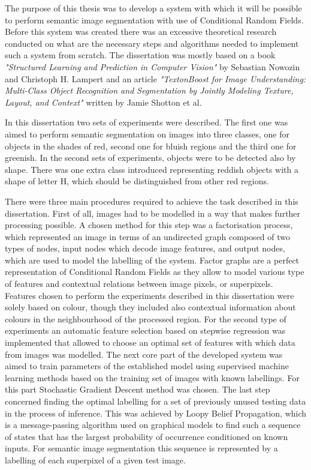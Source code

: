 The purpose of this thesis was to develop a system with which it will be possible to perform semantic image segmentation with use of Conditional Random Fields. Before this system was created there was an excessive theoretical research conducted on what are the necessary steps and algorithms needed to implement such a system from scratch. The dissertation was mostly based on a book \textit{"Structured Learning and Prediction in Computer Vision"} by Sebastian Nowozin and Christoph H. Lampert and an article \textit{"TextonBoost for Image Understanding: Multi-Class Object Recognition and Segmentation by Jointly Modeling Texture, Layout, and Context"} written by Jamie Shotton et al. 

In this dissertation two sets of experiments were described. The first one was aimed to perform semantic segmentation on images into three classes, one for objects in the shades of red, second one for bluish regions and the third one for greenish. In the second sets of experiments, objects were to be detected also by shape. There was one extra class introduced representing reddish objects with a shape of letter H, which should be distinguished from other red regions. 

There were three main procedures required to achieve the task described in this dissertation. First of all, images had to be modelled in a way that makes further processing possible. A chosen method for this step was a factorisation process, which represented an image in terms of an undirected graph composed of two types of nodes, input nodes which decode image features, and output nodes, which are used to model the labelling of the system. Factor graphs are a perfect representation of Conditional Random Fields as they allow to model various type of features and contextual relations between image pixels, or superpixels. Features chosen to perform the experiments described in this dissertation were solely based on colour, though they included also contextual information about colours in the neighbourhood of the processed region. For the second type of experiments an automatic feature selection based on stepwise regression was implemented that allowed to choose an optimal set of features with which data from images was modelled. The next core part of the developed system was aimed to train parameters of the established model using supervised machine learning methods based on the training set of images with known labellings. For this part Stochastic Gradient Descent method was chosen. The last step concerned finding the optimal labelling for a set of previously unused testing data in the process of inference. This was achieved by Loopy Belief Propagation, which is a message-passing algorithm used on graphical models to find such a sequence of states that has the largest probability of occurrence conditioned on known inputs. For semantic image segmentation this sequence is represented by a labelling of each superpixel of a given test image.

